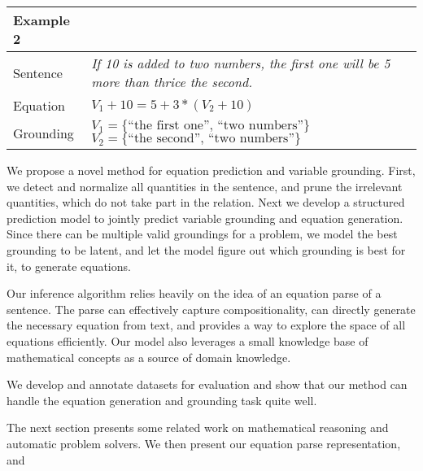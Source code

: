   \setlength{\tabcolsep}{6pt} 
  \begin{table}[H] 
         \centering 
         \small 
         \begin{tabular}{|lp{5cm}|} \hline
         Example 2 & \\ \hline 
         Sentence & {\em If 10 is added to two numbers,
         the first one will be 5 more than thrice the second.} \\ \hline
         Equation & $V_1+10=5+3*(V_2+10)$\\ \hline 
         Grounding & $V_1= \{\text{``the first one'', ``two numbers''}\}$
         $V_2= \{\text{``the second'', ``two numbers''}\}$\\ 
        \hline 
        \end{tabular} 
        \label{tab:example2} 
  \end{table}
  
  We propose a novel method for equation prediction and variable
  grounding. First, we detect and normalize all quantities in the
  sentence, and prune the irrelevant quantities, which do not take
  part in the relation. Next we develop a structured prediction model
  to jointly predict variable grounding and equation generation. Since
  there can be multiple valid groundings for a problem, we model the
  best grounding to be latent, and let the model figure out which
  grounding is best for it, to generate equations.
  
  Our inference algorithm relies heavily on the idea of an equation
  parse of a sentence. The parse can effectively capture
  compositionality, can directly generate the necessary equation from
  text, and provides a way to explore the space of all equations
  efficiently. Our model also leverages a small knowledge base of
  mathematical concepts as a source of domain knowledge.

  We develop and annotate datasets for evaluation and show that our
  method can handle the equation generation and grounding task quite
  well.

  The next section presents some related work on mathematical
  reasoning and automatic problem solvers. We then present our
  equation parse representation, and
  
